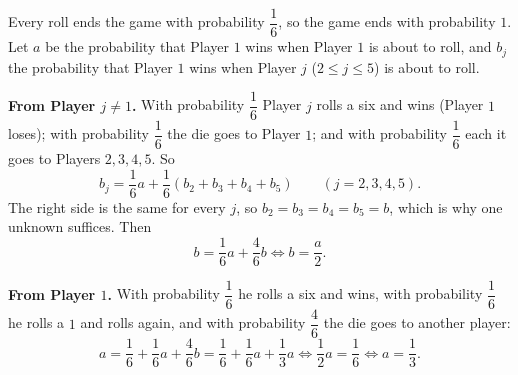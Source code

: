 Every roll ends the game with probability $\dfrac16$, so the game ends with probability $1$. Let $a$ be the probability that Player $1$ wins when Player $1$ is about to roll, and $b_j$ the probability that Player $1$ wins when Player $j$ ($2\le j\le5$) is about to roll.

\textbf{From Player $j\ne1$.} With probability $\dfrac16$ Player $j$ rolls a six and wins (Player $1$ loses); with probability $\dfrac16$ the die goes to Player $1$; and with probability $\dfrac16$ each it goes to Players $2,3,4,5$. So
\[b_j=\dfrac16a+\dfrac16\left(b_2+b_3+b_4+b_5\right)\qquad(j=2,3,4,5).\]
The right side is the same for every $j$, so $b_2=b_3=b_4=b_5=b$, which is why one unknown suffices. Then
\[b=\dfrac16a+\dfrac46b\iff b=\dfrac a2.\]

\textbf{From Player $1$.} With probability $\dfrac16$ he rolls a six and wins, with probability $\dfrac16$ he rolls a $1$ and rolls again, and with probability $\dfrac46$ the die goes to another player:
\[a=\dfrac16+\dfrac16a+\dfrac46b=\dfrac16+\dfrac16a+\dfrac13a\iff\dfrac12a=\dfrac16\iff a=\boxed{\dfrac13}.\]
